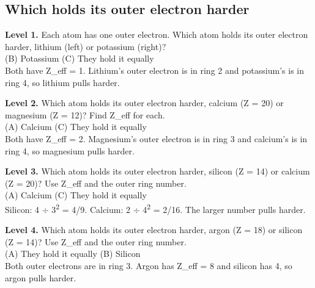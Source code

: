 \documentclass[11pt]{article}
\begin{document}
\subsection*{Which holds its outer electron harder}
\noindent\textbf{Level 1.} Each atom has one outer electron. Which atom holds its outer electron harder, lithium (left) or potassium (right)?\\  \quad (B) Potassium \quad (C) They hold it equally\\  \quad Both have Z\_eff = 1. Lithium's outer electron is in ring 2 and potassium's is in ring 4, so lithium pulls harder.\par\medskip
\noindent\textbf{Level 2.} Which atom holds its outer electron harder, calcium (Z = 20) or magnesium (Z = 12)? Find Z\_eff for each.\\ (A) Calcium \quad {} \quad (C) They hold it equally\\  \quad Both have Z\_eff = 2. Magnesium's outer electron is in ring 3 and calcium's is in ring 4, so magnesium pulls harder.\par\medskip
\noindent\textbf{Level 3.} Which atom holds its outer electron harder, silicon (Z = 14) or calcium (Z = 20)? Use Z\_eff and the outer ring number.\\ (A) Calcium \quad {} \quad (C) They hold it equally\\  \quad Silicon: 4 $\div$ 3\textsuperscript{2} = 4/9. Calcium: 2 $\div$ 4\textsuperscript{2} = 2/16. The larger number pulls harder.\par\medskip
\noindent\textbf{Level 4.} Which atom holds its outer electron harder, argon (Z = 18) or silicon (Z = 14)? Use Z\_eff and the outer ring number.\\ (A) They hold it equally \quad (B) Silicon \quad {}\\  \quad Both outer electrons are in ring 3. Argon has Z\_eff = 8 and silicon has 4, so argon pulls harder.\par\medskip
\end{document}
